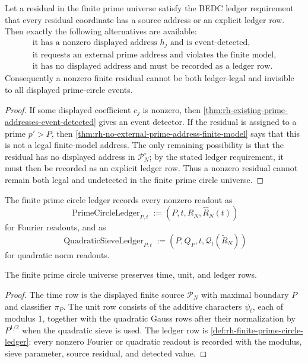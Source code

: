 \begin{theorem}
\label{thm:rh-address-trichotomy-finite-residuals}
Let a residual in the finite prime universe satisfy the BEDC ledger
requirement that every residual coordinate has a source address or an
explicit ledger row.  Then exactly the following alternatives are
available:
$$
\begin{gathered}
\text{it has a nonzero displayed address }h_j\text{ and is event-detected},\\
\text{it requests an external prime address and violates the finite model},\\
\text{it has no displayed address and must be recorded as a ledger row}.
\end{gathered}
$$
Consequently a nonzero finite residual cannot be both ledger-legal and
invisible to all displayed prime-circle events.
\end{theorem}

\begin{proof}
If some displayed coefficient $c_j$ is nonzero, then
\autoref{thm:rh-existing-prime-addresses-event-detected} gives an event
detector.  If the residual is assigned to a prime $p'>P$, then
\autoref{thm:rh-no-external-prime-address-finite-model} says that this
is not a legal finite-model address.  The only remaining possibility is
that the residual has no displayed address in $\mathcal P_N^\circ$; by
the stated ledger requirement, it must then be recorded as an explicit
ledger row.  Thus a nonzero residual cannot remain both legal and
undetected in the finite prime circle universe.
\end{proof}

\begin{definition}
\label{def:rh-finite-prime-circle-ledger}
The finite prime circle ledger records every nonzero readout as
$$
\operatorname{PrimeCircleLedger}_{P,t}
:=
(P,t,R_N,\widehat R_N(t))
$$
for Fourier readouts, and as
$$
\operatorname{QuadraticSieveLedger}_{P,t}
:=
(P,Q_P,t,\mathcal Q_t(\widetilde R_N))
$$
for quadratic norm readouts.
\end{definition}

\begin{theorem}
\label{thm:rh-finite-prime-circle-universe-preserves-bedc-rows}
The finite prime circle universe preserves time, unit, and ledger rows.
\end{theorem}

\begin{proof}
The time row is the displayed finite source $\mathcal P_N$ with maximal
boundary $P$ and classifier $\pi_P$.  The unit row consists of the
additive characters $\psi_t$, each of modulus $1$, together with the
quadratic Gauss rows after their normalization by $P^{1/2}$ when the
quadratic sieve is used.  The ledger row is
\autoref{def:rh-finite-prime-circle-ledger}: every nonzero Fourier or
quadratic readout is recorded with the modulus, sieve parameter,
source residual, and detected value.
\end{proof}

